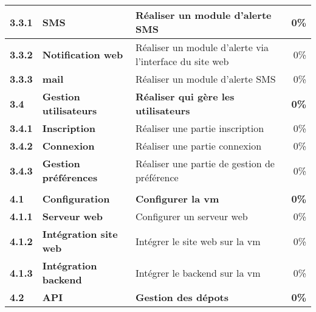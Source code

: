\begin{tabular}{|l|l|>{\raggedright}p{5cm}|r|}
  \hspace{6pt} \bfseries{3.3.1}  & \bfseries{SMS} & Réaliser un module d'alerte SMS  & 0\% \\
  \hline

  \hspace{6pt} \bfseries{3.3.2}  & \bfseries{Notification web} & Réaliser un module d'alerte via l'interface du site web & 0\% \\
  \hline

  \hspace{6pt} \bfseries{3.3.3}  & \bfseries{mail} & Réaliser un module d'alerte SMS & 0\% \\
  \hline


  \rowcolor{lightGray} \bfseries{3.4}  & \bfseries{Gestion utilisateurs} & \bfseries{Réaliser qui gère les utilisateurs} & \bfseries{0\%} \\
  \hline

  \hspace{6pt} \bfseries{3.4.1}  & \bfseries{Inscription} & Réaliser une partie inscription & 0\% \\
  \hline

  \hspace{6pt} \bfseries{3.4.2}  & \bfseries{Connexion} & Réaliser une partie connexion & 0\% \\
  \hline

  \hspace{6pt} \bfseries{3.4.3}  & \bfseries{Gestion préférences} & Réaliser une partie de gestion de préférence & 0\% \\
  \hline






  \rowcolor{myBlue} \color{White}{\bfseries 4}  & \color{White}{\bfseries Machine virtuelle} & \color{White}{\bfseries Réaliser une vm} & \color{White}{\bfseries 0\%} \\
  \hline

  \rowcolor{lightGray} \bfseries{4.1}  & \bfseries{Configuration} & \bfseries{Configurer la vm} & \bfseries{0\%} \\
  \hline

  \hspace{6pt} \bfseries{4.1.1}  & \bfseries{Serveur web} & Configurer un serveur web & 0\% \\
  \hline

  \hspace{6pt} \bfseries{4.1.2}  & \bfseries{Intégration site web} & Intégrer le site web sur la vm & 0\% \\
  \hline

  \hspace{6pt} \bfseries{4.1.3}  & \bfseries{Intégration backend} & Intégrer le backend sur la vm & 0\% \\
  \hline


  \rowcolor{lightGray} \bfseries{4.2}  & \bfseries{API} & \bfseries{Gestion des dépots} & \bfseries{0\%} \\
  \hline



\end{tabular}
\normalsize
